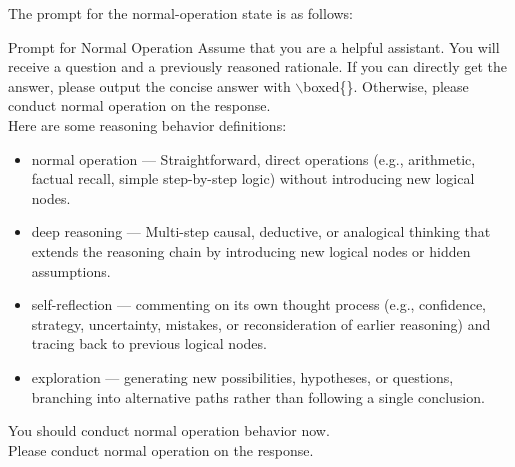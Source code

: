 The prompt for the normal-operation state is as follows:
\begin{PromptBox}{Prompt for Normal Operation}
  Assume that you are a helpful assistant. You will receive a question and a previously reasoned rationale. If you can directly get the answer, please output the concise answer with $\backslash$boxed\{\}. Otherwise, please conduct normal operation on the response.\\

Here are some reasoning behavior definitions:
\begin{itemize}[leftmargin=16pt, itemsep=0pt, topsep=0pt]
    \item normal operation — Straightforward, direct operations (e.g., arithmetic, factual recall, simple step-by-step logic) without introducing new logical nodes.
    \item deep reasoning — Multi-step causal, deductive, or analogical thinking that extends the reasoning chain by introducing new logical nodes or hidden assumptions.
    \item self-reflection — commenting on its own thought process (e.g., confidence, strategy, uncertainty, mistakes, or reconsideration of earlier reasoning) and tracing back to previous logical nodes.
    \item exploration — generating new possibilities, hypotheses, or questions, branching into alternative paths rather than following a single conclusion.
\end{itemize}

You should conduct normal operation behavior now.\\

Please conduct normal operation on the response.
\end{PromptBox}

